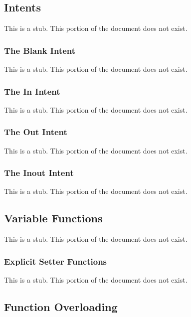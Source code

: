 \subsection{Intents}
\label{Intents}

This is a stub.  This portion of the document does not exist.

\subsubsection{The Blank Intent}
\label{The_Blank_Intent}

This is a stub.  This portion of the document does not exist.

\subsubsection{The In Intent}
\label{The_In_Intent}

This is a stub.  This portion of the document does not exist.

\subsubsection{The Out Intent}
\label{The_Out_Intent}

This is a stub.  This portion of the document does not exist.

\subsubsection{The Inout Intent}
\label{The_Inout_Intent}

This is a stub.  This portion of the document does not exist.

\subsection{Variable Functions}
\label{Variable_Functions}

This is a stub.  This portion of the document does not exist.

\subsubsection{Explicit Setter Functions}
\label{Explicit_Setter_Functions}

This is a stub.  This portion of the document does not exist.

\subsection{Function Overloading}
\label{Function_Overloading}

